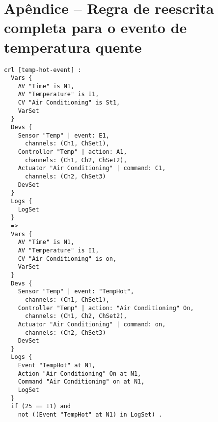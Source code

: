 \section{Apêndice -- Regra de reescrita completa para o evento de temperatura quente} \label{apx:apx2}
\begin{verbatim}
crl [temp-hot-event] :
  Vars {
    AV "Time" is N1,
    AV "Temperature" is I1,
    CV "Air Conditioning" is St1,
    VarSet
  }
  Devs {
    Sensor "Temp" | event: E1, 
      channels: (Ch1, ChSet1),
    Controller "Temp" | action: A1, 
      channels: (Ch1, Ch2, ChSet2),
    Actuator "Air Conditioning" | command: C1,
      channels: (Ch2, ChSet3)
    DevSet
  }
  Logs {
    LogSet
  }
  =>
  Vars {
    AV "Time" is N1,
    AV "Temperature" is I1,
    CV "Air Conditioning" is on,
    VarSet
  }
  Devs {
    Sensor "Temp" | event: "TempHot", 
      channels: (Ch1, ChSet1),
    Controller "Temp" | action: "Air Conditioning" On,
      channels: (Ch1, Ch2, ChSet2),
    Actuator "Air Conditioning" | command: on,
      channels: (Ch2, ChSet3)
    DevSet
  }
  Logs {
    Event "TempHot" at N1,
    Action "Air Conditioning" On at N1,
    Command "Air Conditioning" on at N1,
    LogSet
  }
  if (25 == I1) and 
    not ((Event "TempHot" at N1) in LogSet) .
\end{verbatim}
